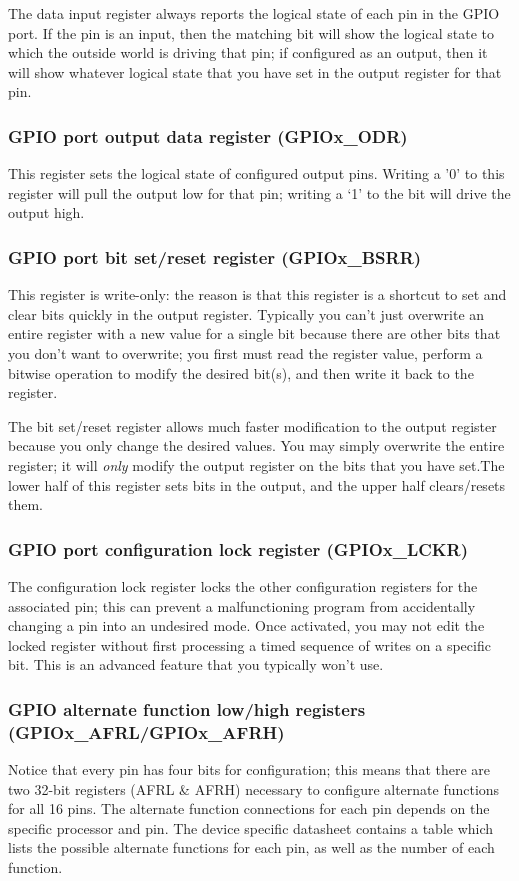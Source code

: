 \documentclass[11pt,fleqn]{book} %
\begin{document}
The data input register always reports the logical state of each pin in the GPIO port. If the pin is an input, then the matching bit will show the logical state to which the outside world is driving that pin; if configured as an output, then it will show whatever logical state that you have set in the output register for that pin.

\subsubsection{GPIO port output data register (GPIOx\_ODR)}
This register sets the logical state of configured output pins. Writing a '0' to this register will pull the output low for that pin; writing a `1' to the bit will drive the output high.

\subsubsection{GPIO port bit set/reset register (GPIOx\_BSRR)}
This register is write-only: the reason is that this register is a shortcut to set and clear bits quickly in the output register. Typically you can't just overwrite an entire register with a new value for a single bit because there are other bits that you don't want to overwrite; you first must read the register value, perform a bitwise operation to modify the desired bit(s), and then write it back to the register.

The bit set/reset register allows much faster modification to the output register because you only change the desired values. You may simply overwrite the entire register; it will \textit{only} modify the output register on the bits that you have set.The lower half of this register sets bits in the output, and the upper half clears/resets them.

\subsubsection{GPIO port configuration lock register (GPIOx\_LCKR)}
The configuration lock register locks the other configuration registers for the associated pin; this can prevent a malfunctioning program from accidentally changing a pin into an undesired mode. Once activated, you may not edit the locked register without first processing a timed sequence of writes on a specific bit. This is an advanced feature that you typically won't use.

\subsubsection{GPIO alternate function low/high registers (GPIOx\_AFRL/GPIOx\_AFRH)}
Notice that every pin has four bits for configuration; this means that there are two 32-bit registers (AFRL \& AFRH) necessary to configure alternate functions for all 16 pins. The alternate function connections for each pin depends on the specific processor and pin. The device specific datasheet contains a table which lists the possible alternate functions for each pin, as well as the number of each function.
\end{document}

